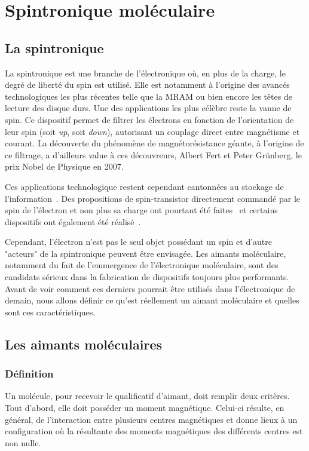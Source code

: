 \chapter{Spintronique moléculaire}

\section{La spintronique}
La spintronique est une branche de l'électronique où, en plus de la charge, le degré de liberté du spin est utilisé. Elle est notamment à l'origine des avancés technologiques les plus récentes telle que la MRAM ou bien encore les têtes de lecture des disque durs. Une des applications les plus célèbre reste la vanne de spin. Ce dispositif permet de filtrer les électrons en fonction de l'orientation de leur spin (soit \textit{up}, soit \textit{down}), autorisant un couplage direct entre magnétisme et courant. La découverte du phénomène de magnétorésistance géante, à l'origine de ce filtrage, a d'ailleurs value à ces découvreurs, Albert Fert et Peter Grünberg, le prix Nobel de Physique en 2007.


Ces applications technologique restent cependant cantonnées au stockage de  l'information~\cite{Awschalom2007}. Des propositions de spin-transistor directement commandé par le spin de l'électron et non plus sa charge ont pourtant été faites~\cite{Datta1990} et certains dispositifs ont également été réalisé~\cite{Johnson1996,Huang2007}.

Cependant, l'électron n'est pas le seul objet possédant un spin et d'autre "acteurs" de la spintronique peuvent être envisagée. Les aimants moléculaire, notamment du fait de l'emmergence de l'électronique moléculaire, sont des candidats sérieux dans la fabrication de dispositifs toujours plus performants. Avant de voir comment ces derniers pourrait \^etre utilisés dans l'électronique de demain, nous allons définir ce qu'est réellement un aimant moléculaire et quelles sont ces caractéristiques.

\section{Les aimants moléculaires}
\subsection{Définition}

Un molécule, pour recevoir le qualificatif d'aimant, doit remplir deux critères. Tout d'abord, elle doit posséder un moment magnétique. Celui-ci résulte, en général, de l'interaction entre plusieurs centres magnétiques et donne lieux à un configuration où la résultante des moments magnétiques des différents centres est non nulle. 

